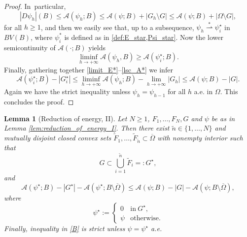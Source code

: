 \documentclass[11pt]{article}
\numberwithin{equation}{section}
\let\Om\Omega
\newcommand{\weakstar}{\stackrel{*}{\rightharpoonup}}
\newtheorem{lemma}[theorem]{Lemma}
\theoremstyle{definition}
\begin{document}
\begin{proof}
In~particular,
\begin{equation*}
|D\psi_{h}|(B)\le\mathcal{A}(\psi_{h};B)\le \mathcal{A}(\psi;B)+|G_{h}\setminus G|\le \mathcal{A}(\psi;B)+|\Om\setminus G|,
\end{equation*}
for all $h\ge1$, and then we easily see that, up to a subsequence, $\psi_{h}\weakstar\psi^\star_i$ in $BV(B)$, where $\psi_i^*$ is defined as in \eqref{def:E_star,Psi_star}.
Now the lower semicontinuity of $\mathcal{A}(\cdot;B)$ yields
\begin{equation}\label{lsc_A*}
\liminf_{h\to+\infty}\mathcal{A}(\psi_{h},B)\ge
\mathcal{A}(\psi_i^\star;B).
\end{equation}
Finally, gathering together \eqref{limit_E*}--\eqref{lsc_A*} we infer
\begin{equation*}
\mathcal{A}(\psi_i^\star;B)-|G^\star_i|\le
\liminf_{h\to+\infty}\mathcal{A}(\psi_{h};B)-\lim_{h\to+\infty}|G_{h}|\le
\mathcal{A}(\psi;B)-|G|.
\end{equation*}
Again we have the strict inequality unless $\psi_h=\psi_{h-1}$ for all $h$ a.e. in $\Om$.
This concludes the proof.
\end{proof}

\begin{lemma}[Reduction of energy, II]
\label{lem:reduction_of_energy_II}
Let $N\ge 1$, $F_1,\dots,F_N,G$ and $\psi$ be
as in Lemma \ref{lem:reduction_of_energy_I}.
Then there exist $\tilde n \in \{1, \dots, N\}$ and mutually disjoint closed convex sets $\widetilde F_1,\dots,\widetilde F_{\tilde n}\subset\overline\Om$ with nonempty interior
such that
\begin{equation}\label{A}
G\subset \bigcup_{i=1}^{\tilde n}\widetilde F_i=:G^\star,
\end{equation}
and
\begin{equation}\label{B}
\mathcal{A}(\psi^\star;B)-|G^\star|-\mathcal{A}(\psi^\star;B\setminus \overline\Om)\le \mathcal A(\psi; B)-|G|-\mathcal{A}(\psi;B\setminus\overline{\Om}),
\end{equation}
where
\begin{equation}\label{C}
\psi^\star:=\begin{cases}
0&\text{in}\ G^\star,\\
\psi&\text{otherwise}.
\end{cases}
\end{equation}
Finally, inequality in \eqref{B} is strict unless $\psi=\psi^\star$ a.e.
\end{lemma}
\end{document}
